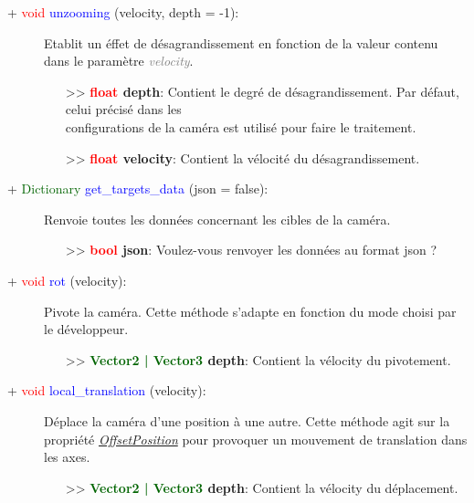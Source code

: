 \documentclass[a4paper, 11pt]{article}
\begin{document}
	\begin{description}
		\item [+ \textcolor{red}{void} \textcolor{blue}{unzooming} (velocity, depth = -1):] Etablit un éffet 
		de désagrandissement en fonction de la valeur contenu dans le paramètre \textit{\textcolor{gray}
		{velocity}}.
		\begin{itemize}
			\item [>> \textbf{\textcolor{red}{float} depth}:] Contient le degré de désagrandissement. Par 
			défaut, celui précisé dans les \\configurations de la caméra est utilisé pour faire le 
			traitement.
			\item [>> \textbf{\textcolor{red}{float} velocity}:] Contient la vélocité du désagrandissement.
			\\
		\end{itemize}
	\end{description}
	\begin{description}
		\item [+ \textcolor{darkgreen}{Dictionary} \textcolor{blue}{get\_targets\_data} (json = false):] 
		Renvoie toutes les données concernant les cibles de la caméra.
		\begin{itemize}
			\item [>> \textbf{\textcolor{red}{bool} json}:] Voulez-vous renvoyer les données au format json 
			?\\
		\end{itemize}
	\end{description}
	\begin{description}
		\item [+ \textcolor{red}{void} \textcolor{blue}{rot} (velocity):] Pivote la caméra. Cette méthode
		s'adapte en fonction du mode choisi par le développeur.
		\begin{itemize}
			\item [>> \textbf{\textcolor{darkgreen}{Vector2 | Vector3} depth}:] Contient la vélocity du 
			pivotement.\\
		\end{itemize}
	\end{description}
	\begin{description}
		\item [+ \textcolor{red}{void} \textcolor{blue}{local\_translation} (velocity):] Déplace la caméra
		d'une position à une autre. Cette méthode agit sur la propriété \textit{\hyperlink{ofstpos}
		{OffsetPosition}} pour provoquer un mouvement de translation dans les axes.
		\begin{itemize}
			\item [>> \textbf{\textcolor{darkgreen}{Vector2 | Vector3} depth}:] Contient la vélocity du 
			déplacement.\\
		\end{itemize}
	\end{description}
\end{document}
